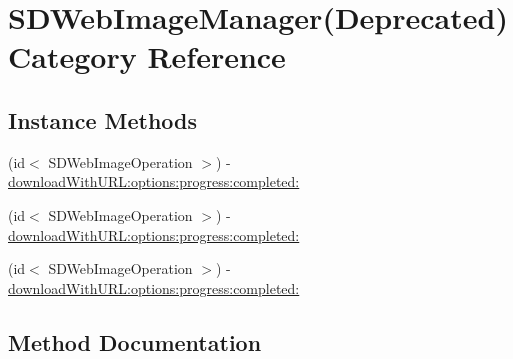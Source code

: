 \hypertarget{category_s_d_web_image_manager_07_deprecated_08}{}\section{S\+D\+Web\+Image\+Manager(Deprecated) Category Reference}
\label{category_s_d_web_image_manager_07_deprecated_08}
\subsection*{Instance Methods}
\begin{DoxyCompactItemize}
\item 
(id$<$ S\+D\+Web\+Image\+Operation $>$) -\/ \mbox{\hyperlink{category_s_d_web_image_manager_07_deprecated_08_a6ed93377fa34b44c02bce84279529dad}{download\+With\+U\+R\+L\+:options\+:progress\+:completed\+:}}
\item 
(id$<$ S\+D\+Web\+Image\+Operation $>$) -\/ \mbox{\hyperlink{category_s_d_web_image_manager_07_deprecated_08_a6ed93377fa34b44c02bce84279529dad}{download\+With\+U\+R\+L\+:options\+:progress\+:completed\+:}}
\item 
(id$<$ S\+D\+Web\+Image\+Operation $>$) -\/ \mbox{\hyperlink{category_s_d_web_image_manager_07_deprecated_08_a6ed93377fa34b44c02bce84279529dad}{download\+With\+U\+R\+L\+:options\+:progress\+:completed\+:}}
\end{DoxyCompactItemize}


\subsection{Method Documentation}
\mbox{\label{category_s_d_web_image_manager_07_deprecated_08_a6ed93377fa34b44c02bce84279529dad}} 
